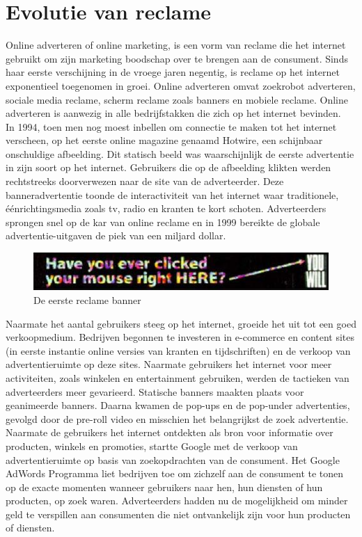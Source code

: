 \documentclass[pdftex,a4paper,12pt,twoside]{report}
\begin{document}
\section{Evolutie van reclame}
\label{sec:Evolutie van reclame}
Online adverteren of online marketing, is een vorm van reclame die het internet gebruikt om zijn marketing boodschap over te brengen aan de consument. Sinds haar eerste verschijning in de vroege jaren negentig, is reclame op het internet exponentieel toegenomen in groei. Online adverteren omvat zoekrobot adverteren, sociale media reclame, scherm reclame zoals banners en mobiele reclame. Online adverteren is aanwezig in alle bedrijfstakken die zich op het internet bevinden.
\\
In 1994, toen men nog moest inbellen om connectie te maken tot het internet verscheen, op het eerste online magazine genaamd Hotwire, een schijnbaar onschuldige afbeelding. Dit statisch beeld was waarschijnlijk de eerste advertentie in zijn soort op het internet. Gebruikers die op de afbeelding klikten werden rechtstreeks doorverwezen naar de site van de adverteerder. Deze banneradvertentie toonde de interactiviteit van het internet waar traditionele, éénrichtingsmedia zoals tv, radio en kranten te kort schoten. Adverteerders sprongen snel op de kar van online reclame en in 1999 bereikte de globale advertentie-uitgaven de piek van een miljard dollar.
\begin{figure}[h!]
\centering
\includegraphics[width=12cm]{img/firstbanner}
\caption{De eerste reclame banner}
\label{fig: Banner-Ads}
\end{figure}
Naarmate het aantal gebruikers steeg op het internet, groeide het uit tot een goed verkoopmedium. Bedrijven begonnen te investeren in e-commerce en content sites (in eerste instantie online versies van kranten en tijdschriften) en de verkoop van advertentieruimte op deze sites. Naarmate gebruikers het internet voor meer activiteiten, zoals winkelen en entertainment gebruiken, werden de tactieken van adverteerders meer gevarieerd. Statische banners maakten plaats voor geanimeerde banners. Daarna kwamen de pop-ups en de pop-under advertenties, gevolgd door de pre-roll video en misschien het belangrijkst de zoek advertentie. 
\\
Naarmate de gebruikers het internet ontdekten als bron voor informatie over producten, winkels en promoties, startte Google met de verkoop van advertentieruimte op basis van zoekopdrachten van de consument. Het Google AdWords Programma liet bedrijven toe om zichzelf aan de consument te tonen op de exacte momenten wanneer gebruikers naar hen, hun diensten of hun producten, op zoek waren. Adverteerders hadden nu de mogelijkheid om minder geld te verspillen aan consumenten die niet ontvankelijk zijn voor hun producten of diensten.
\end{document}

